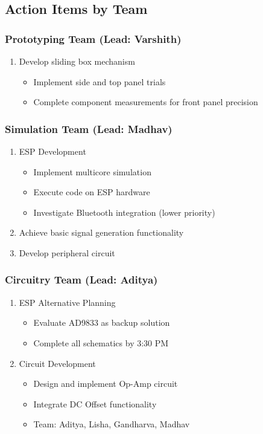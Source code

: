 \documentclass[12pt,a4paper]{article}
\begin{document}
\subsection*{Action Items by Team}
\subsubsection*{Prototyping Team (Lead: Varshith)}
\begin{enumerate}
    \item Develop sliding box mechanism
    \begin{itemize}
        \item Implement side and top panel trials
        \item Complete component measurements for front panel precision
    \end{itemize}
\end{enumerate}

\subsubsection*{Simulation Team (Lead: Madhav)}
\begin{enumerate}
    \item ESP Development
    \begin{itemize}
        \item Implement multicore simulation
        \item Execute code on ESP hardware
        \item Investigate Bluetooth integration (lower priority)
    \end{itemize}
    \item Achieve basic signal generation functionality
    \item Develop peripheral circuit
\end{enumerate}

\subsubsection*{Circuitry Team (Lead: Aditya)}
\begin{enumerate}
    \item ESP Alternative Planning
    \begin{itemize}
        \item Evaluate AD9833 as backup solution
        \item Complete all schematics by 3:30 PM
    \end{itemize}
    \item Circuit Development
    \begin{itemize}
        \item Design and implement Op-Amp circuit
        \item Integrate DC Offset functionality
        \item Team: Aditya, Lisha, Gandharva, Madhav
    \end{itemize}
\end{enumerate}
\end{document}
